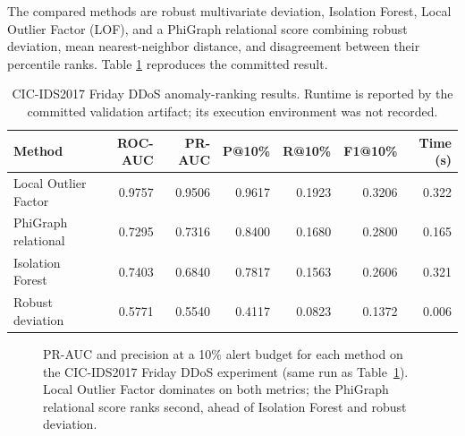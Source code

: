 \documentclass[11pt]{article}
\begin{document}
The compared methods are robust multivariate deviation, Isolation Forest,
Local Outlier Factor (LOF), and a PhiGraph relational score combining robust
deviation, mean nearest-neighbor distance, and disagreement between their
percentile ranks. Table
\ref{tab:cicids} reproduces the committed result.

\begin{table}[H]
\centering
\small
\caption{CIC-IDS2017 Friday DDoS anomaly-ranking results. Runtime is reported
by the committed validation artifact; its execution environment was not
recorded.}
\label{tab:cicids}
\begin{tabular}{lrrrrrr}
\toprule
Method & ROC-AUC & PR-AUC & P@10\% & R@10\% & F1@10\% & Time (s)\\
\midrule
Local Outlier Factor & 0.9757 & 0.9506 & 0.9617 & 0.1923 & 0.3206 & 0.322\\
PhiGraph relational  & 0.7295 & 0.7316 & 0.8400 & 0.1680 & 0.2800 & 0.165\\
Isolation Forest     & 0.7403 & 0.6840 & 0.7817 & 0.1563 & 0.2606 & 0.321\\
Robust deviation     & 0.5771 & 0.5540 & 0.4117 & 0.0823 & 0.1372 & 0.006\\
\bottomrule
\end{tabular}
\end{table}

\begin{figure}[H]
\centering
{}
\caption{PR-AUC and precision at a 10\% alert budget for each method on the
CIC-IDS2017 Friday DDoS experiment (same run as Table~\ref{tab:cicids}). Local
Outlier Factor dominates on both metrics; the PhiGraph relational score ranks
second, ahead of Isolation Forest and robust deviation.}
\label{fig:cicids-bars}
\end{figure}
\end{document}
